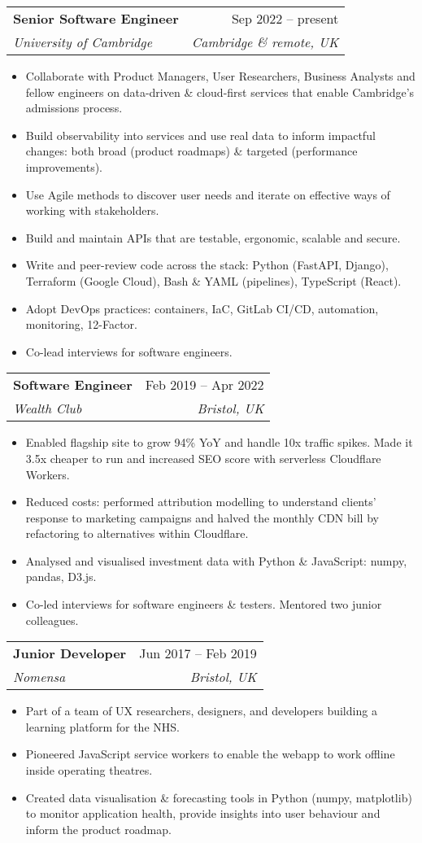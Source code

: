 \documentclass[a4paper,12pt]{article}
\makeatletter
\newcommand{\resumeItem}[1]{
  \item\small{
    {#1 \vspace{-2pt}}
  }
}
\newcommand{\resumeSubheading}[4]{
  \vspace{-2pt}\item
    \begin{tabular*}{0.97\textwidth}[t]{l@{\extracolsep{\fill}}r}
      \textbf{#1} & #2 \\
      \textit{\small#3} & \textit{\small #4} \\
    \end{tabular*}\vspace{-7pt}
}
\newcommand{\resumeItemListStart}{\begin{itemize}}
\newcommand{\resumeItemListEnd}{\end{itemize}\vspace{-5pt}}
\makeatother
\begin{document}
    \resumeSubheading
      {Senior Software Engineer}{Sep 2022 -- present}
      {University of Cambridge}{Cambridge \& remote, UK}
      \vspace{0pt}
    \resumeItemListStart
        \resumeItem{Collaborate with Product Managers, User Researchers, Business Analysts and fellow engineers on data-driven \& cloud-first services that enable Cambridge's admissions process.}
        \resumeItem{Build observability into services and use real data to inform impactful changes: both broad (product roadmaps) \& targeted (performance improvements).}
        \resumeItem{Use Agile methods to discover user needs and iterate on effective ways of working with stakeholders.}
        \resumeItem{Build and maintain APIs that are testable, ergonomic, scalable and secure.}
        \resumeItem{Write and peer-review code across the stack: Python (FastAPI, Django), Terraform (Google Cloud), Bash \& YAML (pipelines), TypeScript (React).}
        \resumeItem{Adopt DevOps practices: containers, IaC, GitLab CI/CD, automation, monitoring, 12-Factor.}
        \resumeItem{Co-lead interviews for software engineers.}
    \resumeItemListEnd
      \vspace{4pt}

    \resumeSubheading
      {Software Engineer}{Feb 2019 -- Apr 2022}
      {Wealth Club}{Bristol, UK}
      \vspace{0pt}
    \resumeItemListStart
        \resumeItem{Enabled flagship site to grow 94\% YoY and handle 10x traffic spikes. Made it 3.5x cheaper to run and increased SEO score with serverless Cloudflare Workers.}
        \resumeItem{Reduced costs: performed attribution modelling to understand clients' response to marketing campaigns and halved the monthly CDN bill by refactoring to alternatives within Cloudflare.}
        \resumeItem{Analysed and visualised investment data with Python \& JavaScript: numpy, pandas, D3.js.}
        \resumeItem{Co-led interviews for software engineers \& testers. Mentored two junior colleagues.}
    \resumeItemListEnd
      \vspace{4pt}

    \resumeSubheading
      {Junior Developer}{Jun 2017 -- Feb 2019}
      {Nomensa}{Bristol, UK}
      \vspace{0pt}
    \resumeItemListStart
        \resumeItem{Part of a team of UX researchers, designers, and developers building a learning platform for the NHS.}
        \resumeItem{Pioneered JavaScript service workers to enable the webapp to work offline inside operating theatres.}
        \resumeItem{Created data visualisation \& forecasting tools in Python (numpy, matplotlib) to monitor application health, provide insights into user behaviour and inform the product roadmap.}
    \resumeItemListEnd
\end{document}
